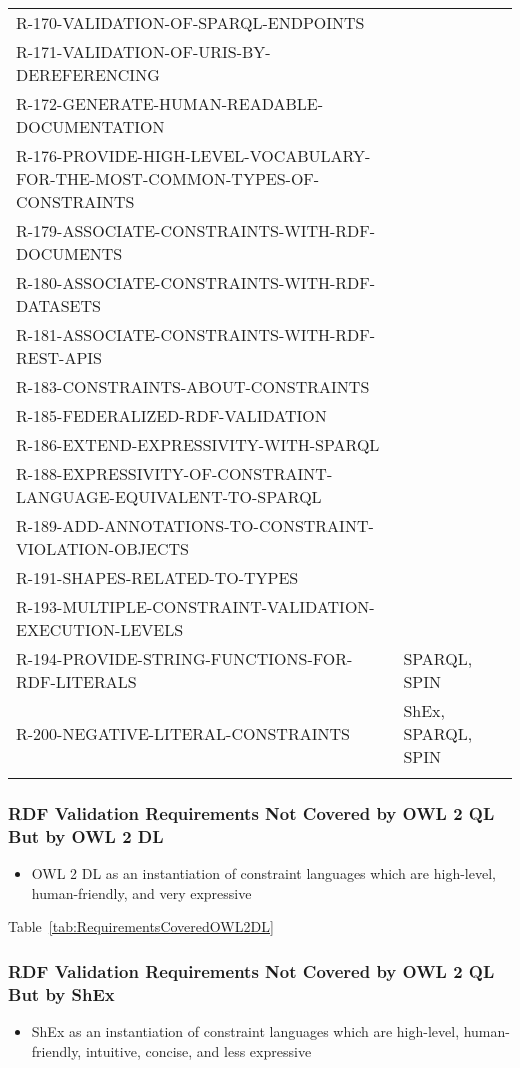 \documentclass{llncs}
\newcommand{\hr}{\hline\noalign{\smallskip}} %
\begin{document}
\begin{table}
\begin{tabular}{ll}
R-170-VALIDATION-OF-SPARQL-ENDPOINTS & \\
R-171-VALIDATION-OF-URIS-BY-DEREFERENCING & \\
R-172-GENERATE-HUMAN-READABLE-DOCUMENTATION & \\
R-176-PROVIDE-HIGH-LEVEL-VOCABULARY-FOR-THE-MOST-COMMON-TYPES-OF-CONSTRAINTS & \\
R-179-ASSOCIATE-CONSTRAINTS-WITH-RDF-DOCUMENTS & \\
R-180-ASSOCIATE-CONSTRAINTS-WITH-RDF-DATASETS & \\
R-181-ASSOCIATE-CONSTRAINTS-WITH-RDF-REST-APIS & \\
R-183-CONSTRAINTS-ABOUT-CONSTRAINTS & \\
R-185-FEDERALIZED-RDF-VALIDATION & \\
R-186-EXTEND-EXPRESSIVITY-WITH-SPARQL & \\
R-188-EXPRESSIVITY-OF-CONSTRAINT-LANGUAGE-EQUIVALENT-TO-SPARQL & \\
R-189-ADD-ANNOTATIONS-TO-CONSTRAINT-VIOLATION-OBJECTS & \\
R-191-SHAPES-RELATED-TO-TYPES & \\
R-193-MULTIPLE-CONSTRAINT-VALIDATION-EXECUTION-LEVELS & \\
R-194-PROVIDE-STRING-FUNCTIONS-FOR-RDF-LITERALS & SPARQL, SPIN \\
R-200-NEGATIVE-LITERAL-CONSTRAINTS & ShEx, SPARQL, SPIN \\
\hr
\end{tabular}
\end{table}

\subsubsection{RDF Validation Requirements Not Covered by OWL 2 QL But by OWL 2 DL}

\begin{itemize}
	\item OWL 2 DL as an instantiation of constraint languages which are high-level, human-friendly, and very expressive 
\end{itemize}

Table~\ref{tab:RequirementsCoveredOWL2DL}

\subsubsection{RDF Validation Requirements Not Covered by OWL 2 QL But by ShEx}

\begin{itemize}
	\item ShEx as an instantiation of constraint languages which are high-level, human-friendly, intuitive, concise, and less expressive 
\end{itemize}
\end{document}
